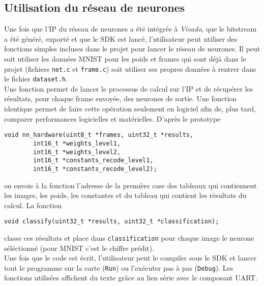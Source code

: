 \subsection{Utilisation du réseau de neurones}
Une fois que l'IP du réseau de neurones a été intégrée à {\em Vivado}, que le
bitstream a été généré, exporté et que le SDK est lancé, l'utilisateur
peut utiliser des fonctions simples incluses dans le projet pour lancer le
réseau de neurones.
Il peut soit utiliser les données MNIST pour les poids et frames qui sont
déjà dans le projet (fichiers \texttt{net.c} et \texttt{frame.c}) soit utiliser
ses propres données à rentrer dans le fichier \texttt{dataset.h}. \\
Une fonction permet de lancer le processus de calcul sur l'IP et de récupérer
les résultats, pour chaque frame envoyée, des neurones de sortie. Une fonction
identique permet de faire cette opération seulement en logiciel afin de, plus
tard, comparer performances logicielles et matérielles. D'après le
prototype

\begin{lstlisting}
void nn_hardware(uint8_t *frames, uint32_t *results,
		int16_t *weights_level1,
		int16_t *weights_level2,
		int16_t *constants_recode_level1,
		int16_t *constants_recode_level2);
\end{lstlisting}

on envoie à la fonction l'adresse de la première case des tableaux qui
contiennent les images, les poids, les constantes et du tableau qui contient
les résultats du calcul. La fonction

\begin{lstlisting}
void classify(uint32_t *results, uint32_t *classification);
\end{lstlisting}

classe ces résultats et place dans \texttt{classification} pour chaque image
le neurone séléctionné (pour MNIST c'est le chiffre prédit). \\
Une fois que le code est écrit, l'utilisateur peut le compiler sous le SDK
et lancer tout le programme sur la carte (\texttt{Run}) ou l'exécuter pas à pas
(\texttt{Debug}). Les fonctions utilisées affichent du texte grâce au lien série
avec le composant UART.

